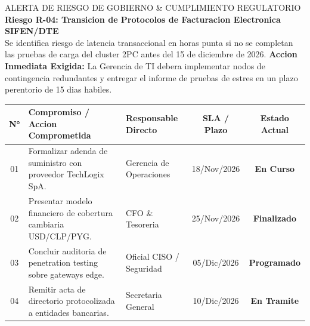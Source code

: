 \documentclass[11pt,a4paper]{article}
\begin{document}
\vspace{1mm}

\begin{corpalert}{ALERTA DE RIESGO DE GOBIERNO \& CUMPLIMIENTO REGULATORIO}
  \textbf{Riesgo R-04: Transicion de Protocolos de Facturacion Electronica SIFEN/DTE}\\
  Se identifica riesgo de latencia transaccional en horas punta si no se completan las pruebas de carga del cluster 2PC antes del 15 de diciembre de 2026.
  \textbf{Accion Inmediata Exigida:} La Gerencia de TI debera implementar nodos de contingencia redundantes y entregar el informe de pruebas de estres en un plazo perentorio de 15 dias habiles.
\end{corpalert}

\vspace{2mm}

\vspace{1mm}

\noindent
\begin{tabularx}{\linewidth}{@{} c X p{3.8cm} c c @{}}
  \toprule
  \rowcolor{corpDarkHeader}
  {\bfseries\color{white}\scriptsize N°} &
  {\bfseries\color{white}\scriptsize Compromiso / Accion Comprometida} &
  {\bfseries\color{white}\scriptsize Responsable Directo} &
  {\bfseries\color{white}\scriptsize SLA / Plazo} &
  {\bfseries\color{white}\scriptsize Estado Actual} \\
  \midrule
  \rowcolor{corpLightBg}
  01 & Formalizar adenda de suministro con proveedor TechLogix SpA. & Gerencia de Operaciones & 18/Nov/2026 & \textcolor{corpWarning}{\textbf{En Curso}} \\
  02 & Presentar modelo financiero de cobertura cambiaria USD/CLP/PYG. & CFO \& Tesoreria & 25/Nov/2026 & \textcolor{corpSuccess}{\textbf{Finalizado}} \\
  \rowcolor{corpLightBg}
  03 & Concluir auditoria de penetration testing sobre gateways edge. & Oficial CISO / Seguridad & 05/Dic/2026 & \textcolor{corpPrimary}{\textbf{Programado}} \\
  04 & Remitir acta de directorio protocolizada a entidades bancarias. & Secretaria General & 10/Dic/2026 & \textcolor{corpWarning}{\textbf{En Tramite}} \\
  \bottomrule
\end{tabularx}

\vspace{3mm}
\end{document}

